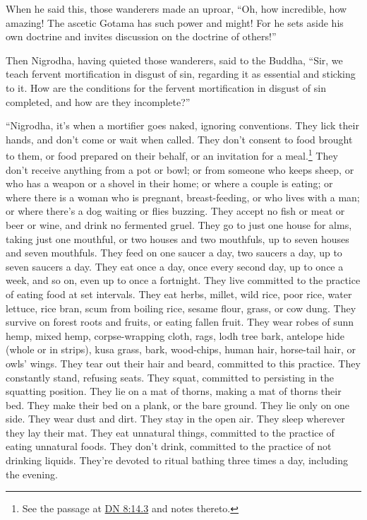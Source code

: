 \documentclass[12pt,openany]{book}%
\begin{document}
When he said this, those wanderers made an uproar, “Oh, how incredible, how amazing! The ascetic Gotama has such power and might! For he sets aside his own doctrine and invites discussion on the doctrine of others!” 

Then Nigrodha, having quieted those wanderers, said to the Buddha, “Sir, we teach fervent mortification in disgust of sin, regarding it as essential and sticking to it. How are the conditions for the fervent mortification in disgust of sin completed, and how are they incomplete?” 

“Nigrodha, it’s when a mortifier goes naked, ignoring conventions. They lick their hands, and don’t come or wait when called. They don’t consent to food brought to them, or food prepared on their behalf, or an invitation for a meal.\footnote{See the passage at \href{https://suttacentral.net/dn8/en/sujato\#14.3}{DN 8:14.3} and notes thereto. } They don’t receive anything from a pot or bowl; or from someone who keeps sheep, or who has a weapon or a shovel in their home; or where a couple is eating; or where there is a woman who is pregnant, breast-feeding, or who lives with a man; or where there’s a dog waiting or flies buzzing. They accept no fish or meat or beer or wine, and drink no fermented gruel. They go to just one house for alms, taking just one mouthful, or two houses and two mouthfuls, up to seven houses and seven mouthfuls. They feed on one saucer a day, two saucers a day, up to seven saucers a day. They eat once a day, once every second day, up to once a week, and so on, even up to once a fortnight. They live committed to the practice of eating food at set intervals. They eat herbs, millet, wild rice, poor rice, water lettuce, rice bran, scum from boiling rice, sesame flour, grass, or cow dung. They survive on forest roots and fruits, or eating fallen fruit. They wear robes of sunn hemp, mixed hemp, corpse-wrapping cloth, rags, lodh tree bark, antelope hide (whole or in strips), kusa grass, bark, wood-chips, human hair, horse-tail hair, or owls’ wings. They tear out their hair and beard, committed to this practice. They constantly stand, refusing seats. They squat, committed to persisting in the squatting position. They lie on a mat of thorns, making a mat of thorns their bed. They make their bed on a plank, or the bare ground. They lie only on one side. They wear dust and dirt. They stay in the open air. They sleep wherever they lay their mat. They eat unnatural things, committed to the practice of eating unnatural foods. They don’t drink, committed to the practice of not drinking liquids. They’re devoted to ritual bathing three times a day, including the evening. 
\end{document}

